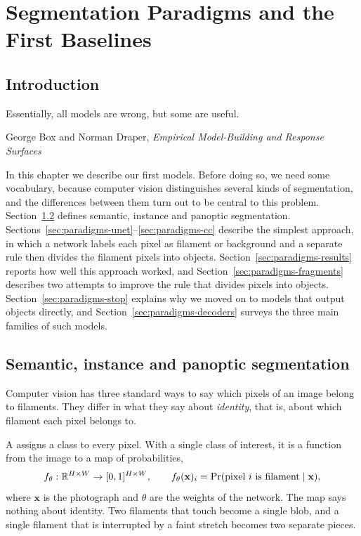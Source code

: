 \chapter{Segmentation Paradigms and the First Baselines}\label{ch:paradigms}

\section{Introduction}\label{sec:paradigms-intro}
\epigraph{Essentially, all models are wrong, but some are useful.}{George Box and Norman Draper,
\emph{Empirical Model-Building and Response Surfaces} \citeyearpar[p.~424]{boxdraper1987}}

In this chapter we describe our first models. Before doing so, we need some vocabulary, because
computer vision distinguishes several kinds of segmentation, and the differences between them
turn out to be central to this problem. Section~\ref{sec:paradigms-kinds} defines semantic,
instance and panoptic segmentation. Sections~\ref{sec:paradigms-unet}--\ref{sec:paradigms-cc}
describe the simplest approach, in which a network labels each pixel as filament or background
and a separate rule then divides the filament pixels into objects. Section~\ref{sec:paradigms-results}
reports how well this approach worked, and Section~\ref{sec:paradigms-fragments} describes two
attempts to improve the rule that divides pixels into objects. Section~\ref{sec:paradigms-stop}
explains why we moved on to models that output objects directly, and
Section~\ref{sec:paradigms-decoders} surveys the three main families of such models.

\section{Semantic, instance and panoptic segmentation}\label{sec:paradigms-kinds}
Computer vision has three standard ways to say which pixels of an image belong to filaments. They
differ in what they say about \emph{identity}, that is, about which filament each pixel belongs to.

A  assigns a class to every pixel. With a single class of interest,
it is a function from the image to a map of probabilities,
\begin{equation}
f_\theta : \mathbb{R}^{H\times W} \to [0,1]^{H\times W}, \qquad
f_\theta(\mathbf{x})_i = \Pr(\text{pixel } i \text{ is filament} \mid \mathbf{x}),
\label{eq:par-semantic}
\end{equation}
where $\mathbf{x}$ is the photograph and $\theta$ are the weights of the network. The map says
nothing about identity. Two filaments that touch become a single blob, and a single filament that
is interrupted by a faint stretch becomes two separate pieces.

